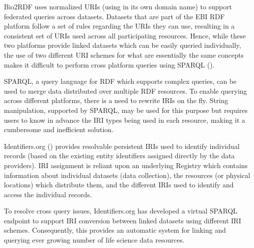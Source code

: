 \documentclass{bioinfo}
\begin{document}
Bio2RDF uses normalized URIs (using in its own domain name) to support federated queries across datasets. Datasets that are part of the EBI RDF platform follow a set of rules regarding the URIs they can use, resulting in a consistent set of URIs used across all participating resources. Hence, while these two platforms provide linked datasets which can be easily queried individually, the use of two different URI schemes for what are essentially the same concepts makes it difficult to perform cross platform queries using SPARQL (\cite{Prud'hommeaux2008}).  

SPARQL, a query language for RDF which supports complex queries, can be used to merge data distributed over multiple RDF resources. To enable querying across different platforms, there is a need to rewrite IRIs on the fly. 
String manipulation, supported by SPARQL, may be used for this purpose but requires users to know in advance the IRI types being used in each resource, making it a cumbersome and inefficient solution. 

Identifiers.org (\cite{Juty01012012}) provides resolvable persistent IRIs used to identify individual records (based on the existing entity identifiers assigned directly by the data providers). IRI assignment is reliant upon an underlying Registry which contains information about individual datasets (data collection), the resources (or physical locations) which distribute them, and the different IRIs used to identify and access the individual records.

To resolve cross query issues, Identifiers.org has developed a virtual SPARQL endpoint to support IRI conversion between linked datasets using different IRI schemes. Consequently, this provides an automatic system for linking and querying ever growing number of life science data resources.
\end{document}
